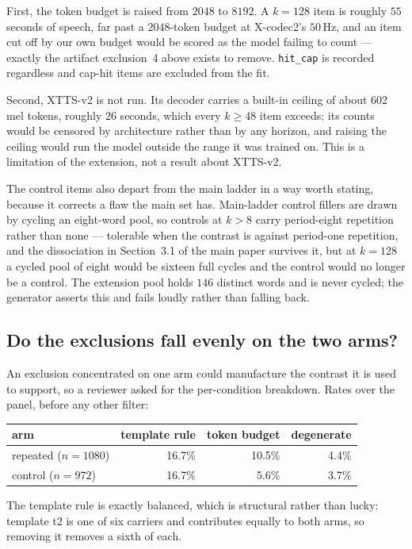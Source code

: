 \documentclass[11pt]{article}
\begin{document}
First, the token budget is raised from $2048$ to $8192$. A $k\!=\!128$ item is
roughly $55$ seconds of speech, far past a $2048$-token budget at X-codec2's
$50$\,Hz, and an item cut off by our own budget would be scored as the model
failing to count --- exactly the artifact exclusion~4 above exists to remove.
\texttt{hit\_cap} is recorded regardless and cap-hit items are excluded from the
fit.

Second, XTTS-v2 is not run. Its decoder carries a built-in ceiling of about
$602$ mel tokens, roughly $26$ seconds, which every $k\ge48$ item exceeds; its
counts would be censored by architecture rather than by any horizon, and raising
the ceiling would run the model outside the range it was trained on. This is a
limitation of the extension, not a result about XTTS-v2.

The control items also depart from the main ladder in a way worth stating,
because it corrects a flaw the main set has. Main-ladder control fillers are
drawn by cycling an eight-word pool, so controls at $k>8$ carry period-eight
repetition rather than none --- tolerable when the contrast is against period-one
repetition, and the dissociation in Section~3.1 of the main paper survives it, but
at $k=128$ a cycled pool of eight would be sixteen full cycles and the control
would no longer be a control. The extension pool holds $146$ distinct words and
is never cycled; the generator asserts this and fails loudly rather than falling
back.


\subsection{Do the exclusions fall evenly on the two arms?}

An exclusion concentrated on one arm could manufacture the contrast it is used to
support, so a reviewer asked for the per-condition breakdown. Rates over the
panel, before any other filter:

\begin{center}
\begin{tabular}{lrrr}
\toprule
arm & template rule & token budget & degenerate \\
\midrule
repeated ($n=1080$) & 16.7\% & 10.5\% & 4.4\% \\
control ($n=972$)   & 16.7\% & 5.6\%  & 3.7\% \\
\bottomrule
\end{tabular}
\end{center}

The template rule is exactly balanced, which is structural rather than lucky:
template t2 is one of six carriers and contributes equally to both arms, so
removing it removes a sixth of each.
\end{document}

